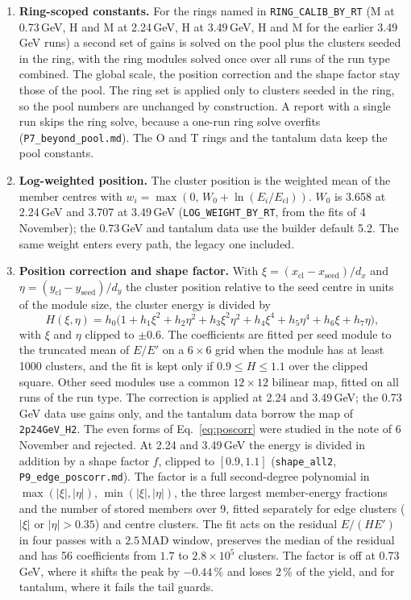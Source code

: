\documentclass[11pt]{article}
\newcommand{\code}[1]{\texttt{#1}}
\begin{document}
\begin{enumerate}
\item \textbf{Ring-scoped constants.} For the rings named in \code{RING\_CALIB\_BY\_RT} (M at 0.73\,GeV, H and M at 2.24\,GeV, H at 3.49\,GeV, H and M for the earlier 3.49\,GeV runs) a second set of gains is solved on the pool plus the clusters seeded in the ring, with the ring modules solved once over all runs of the run type combined. The global scale, the position correction and the shape factor stay those of the pool. The ring set is applied only to clusters seeded in the ring, so the pool numbers are unchanged by construction. A report with a single run skips the ring solve, because a one-run ring solve overfits (\code{P7\_beyond\_pool.md}). The O and T rings and the tantalum data keep the pool constants.
\item \textbf{Log-weighted position.} The cluster position is the weighted mean of the member centres with $w_i = \max(0,\, W_0 + \ln(E_i/E_{\mathrm{cl}}))$. $W_0$ is 3.658 at 2.24\,GeV and 3.707 at 3.49\,GeV (\code{LOG\_WEIGHT\_BY\_RT}, from the fits of 4 November); the 0.73\,GeV and tantalum data use the builder default 5.2. The same weight enters every path, the legacy one included.
\item \textbf{Position correction and shape factor.} With $\xi = (x_{\mathrm{cl}} - x_{\mathrm{seed}})/d_x$ and $\eta = (y_{\mathrm{cl}} - y_{\mathrm{seed}})/d_y$ the cluster position relative to the seed centre in units of the module size, the cluster energy is divided by
\begin{equation}
H(\xi, \eta) = h_0 \big( 1 + h_1 \xi^2 + h_2 \eta^2 + h_3 \xi^2 \eta^2 + h_4 \xi^4 + h_5 \eta^4 + h_6 \xi + h_7 \eta \big),
\label{eq:poscorr}
\end{equation}
with $\xi$ and $\eta$ clipped to $\pm 0.6$. The coefficients are fitted per seed module to the truncated mean of $E/E'$ on a $6 \times 6$ grid when the module has at least 1000 clusters, and the fit is kept only if $0.9 \le H \le 1.1$ over the clipped square. Other seed modules use a common $12 \times 12$ bilinear map, fitted on all runs of the run type. The correction is applied at 2.24 and 3.49\,GeV; the 0.73\,GeV data use gains only, and the tantalum data borrow the map of \code{2p24GeV\_H2}. The even forms of Eq.~\eqref{eq:poscorr} were studied in the note of 6 November and rejected. At 2.24 and 3.49\,GeV the energy is divided in addition by a shape factor $f$, clipped to $[0.9, 1.1]$ (\code{shape\_all2}, \code{P9\_edge\_poscorr.md}). The factor is a full second-degree polynomial in $\max(|\xi|, |\eta|)$, $\min(|\xi|, |\eta|)$, the three largest member-energy fractions and the number of stored members over 9, fitted separately for edge clusters ($|\xi|$ or $|\eta| > 0.35$) and centre clusters. The fit acts on the residual $E/(H E')$ in four passes with a $2.5$\,MAD window, preserves the median of the residual and has 56 coefficients from $1.7$ to $2.8 \times 10^5$ clusters. The factor is off at 0.73\,GeV, where it shifts the peak by $-0.44\,\%$ and loses 2\,\% of the yield, and for tantalum, where it fails the tail guards.

\end{enumerate}
\end{document}
